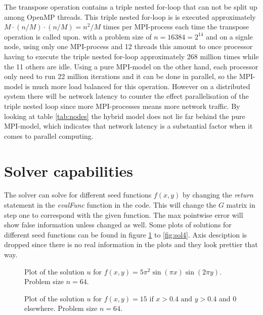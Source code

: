 \documentclass[11pt,a4paper,english]{article}
\numberwithin{figure}{subsection}
\numberwithin{table}{subsection}
\begin{document}
The transpose operation contains a triple nested for-loop that can not be split up among OpenMP threads. This triple nested for-loop is is executed approximately $M\cdot (n/M)\cdot(n/M) = n^2/M$ times per MPI-process each time the transpose operation is called upon. with a problem size of $n=16384=2^{14}$ and on a signle node, using only one MPI-process and 12 threads this amount to once processor having to execute the triple nested for-loop approximately 268 million times while the 11 others are idle. Using a pure MPI-model on the other hand, each processor only need to run 22 million iterations and it can be done in parallel, so the MPI-model is much more load balanced for this operation. However on a distributed system there will be network latency to counter the effect parallelisation of the triple nested loop since more MPI-processes means more network traffic. By looking at table \ref{tab:nodes} the hybrid model does not lie far behind the pure MPI-model, which indicates that network latency is a substantial factor when it comes to parallel computing.

\newpage
\section{Solver capabilities}
The solver can solve for different seed functions $f(x,y)$ by changing the \textit{return} statement in the \textit{evalFunc} function in the code. This will change the $G$ matrix in step one to correspond with the given function. The max pointwise error will show false information unless changed as well. Some plots of solutions for different seed functions can be found in figure \ref{fig:sol1} to \ref{fig:sol4}. Axis desciption is dropped since there is no real information in the plots and they look prettier that way.
	
\begin{figure}[h]
	\centering
	
	\caption{Plot of the solution $u$ for $f(x,y) = 5\pi^2\sin(\pi x)\sin(2\pi y)$. Problem size $n=64$.}
	\label{fig:sol1}
\end{figure}

\begin{figure}[bp]
	\centering
	
	\caption{Plot of the solution $u$ for $f(x,y) = 15 \text{ if } x > 0.4 \text{ and } y > 0.4$ and 0 elsewhere. Problem size $n=64$.}
	\label{fig:sol2}
\end{figure}

%	
\end{document}
